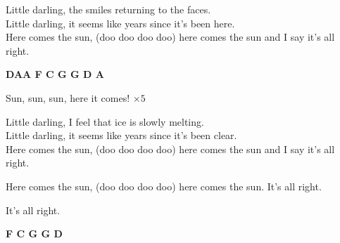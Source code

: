 \vspace{-5mm}

\nv Little darling, the smiles returning to the faces.\\
Little darling, it seems like years since it's been here.\\
Here comes the sun, (doo doo doo doo) here comes the sun and I say it's all right.

\vspace{-5mm}

\nv\textbf{D}\hspace{1cm}\textbf{A\7A\7 F C G G D A\7}

\vspace{5mm}	
\nv{}Sun, sun, sun, here it comes!  $\times 5$
\vspace{5mm}

\nv Little darling, I feel that ice is slowly melting.\\
Little darling, it seems like years since it's been clear.\\
Here comes the sun, (doo doo doo doo) here comes the sun and I say it's all right.


\nv Here comes the sun, (doo doo doo doo) here comes the sun. It's all right.

\vspace{-5mm}

\nv It's all right.


\nv\textbf{F C G G D}
\newpage
